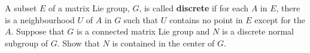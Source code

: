 \documentclass[10pt]{amsart}
\begin{document}
\begin{ex}
  A subset $E$ of a matrix Lie group, $G$, is called {\bf discrete} if for each $A$ in $E$, there is a neighbourhood $U$ of $A$ in $G$ such that $U$ contains no point in $E$ except for the $A$.
  Suppose that $G$ is a connected matrix Lie group and $N$ is a discrete normal subgroup of $G$.
  Show that $N$ is contained in the center of $G$.
\end{ex}
\end{document}
